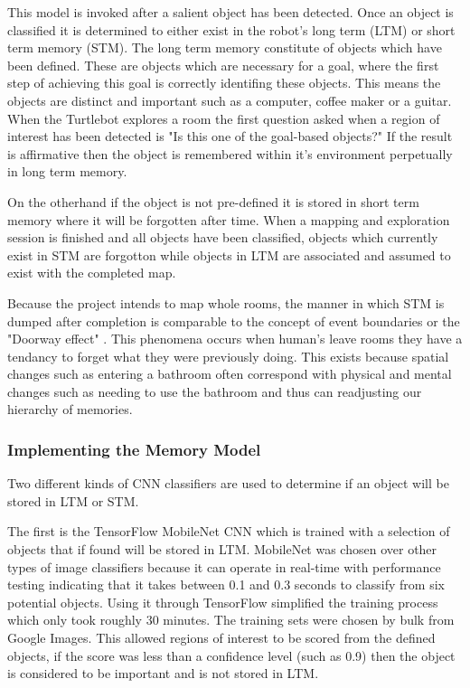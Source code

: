 \documentclass{mproj}
\begin{document}
This model is invoked after a salient object has been detected. Once an object is classified it is determined to either exist in the robot's long term (LTM) or short term memory (STM). The long term memory constitute of objects which have been defined. These are objects which are necessary for a goal, where the first step of achieving this goal is correctly identifing these objects. This means the objects are distinct and important such as a computer, coffee maker or a guitar. When the Turtlebot explores a room the first question asked when a region of interest has been detected is "Is this one of the goal-based objects?" If the result is affirmative then the object is remembered within it's environment perpetually in long term memory. 

On the otherhand if the object is not pre-defined it is stored in short term memory where it will be forgotten after time. When a mapping and exploration session is finished and all objects have been classified, objects which currently exist in STM are forgotton while objects in LTM are associated and assumed to exist with the completed map.

Because the project intends to map whole rooms, the manner in which STM is dumped after completion is comparable to the concept of event boundaries or the "Doorway effect" \cite{doorway}. This phenomena occurs when human's leave rooms they have a tendancy to forget what they were previously doing. This exists because spatial changes such as entering a bathroom often correspond with physical and mental changes such as needing to use the bathroom and thus can readjusting our hierarchy of memories.

\subsubsection{Implementing the Memory Model}

Two different kinds of CNN classifiers are used to determine if an object will be stored in LTM or STM. 

The first is the TensorFlow MobileNet CNN which is trained with a selection of objects that if found will be stored in LTM. MobileNet was chosen over other types of image classifiers because it can operate in real-time with performance testing indicating that it takes between 0.1 and 0.3 seconds to classify from six potential objects. Using it through TensorFlow simplified the training process which only took roughly 30 minutes. The training sets were chosen by bulk from Google Images. This allowed regions of interest to be scored from the defined objects, if the score was less than a confidence level (such as 0.9) then the object is considered to be important and is not stored in LTM.
\end{document}
